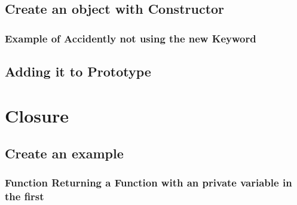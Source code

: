 \documentclass {amsart}
\begin{document}
	\subsection{Create an object with Constructor}
		\subsubsection {Example of Accidently not using the {\bf new} Keyword}
	\subsection{Adding it to Prototype}

\section{Closure}
	\subsection{Create an example}
		\subsubsection{Function Returning a Function with an private variable in the first}
\end{document}
